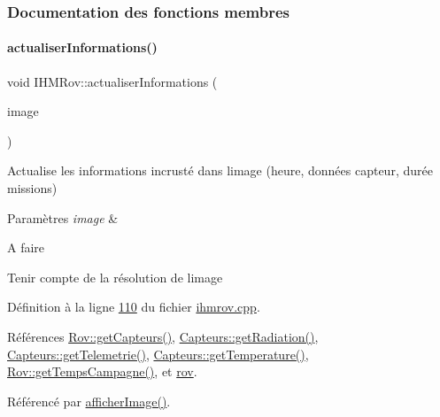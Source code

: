 \subsubsection{Documentation des fonctions membres}
\mbox{\label{class_i_h_m_rov_a58ba3661c111c9ab2d6f1e3c52f4ec21}} 
\paragraph{\texorpdfstring{actualiser\+Informations()}{actualiserInformations()}}
{\footnotesize\ttfamily void I\+H\+M\+Rov\+::actualiser\+Informations (\begin{DoxyParamCaption}\item[{Q\+Pixmap \&}]{image }\end{DoxyParamCaption})\hspace{0.3cm}{\ttfamily [private]}}



Actualise les informations incrusté dans l\textquotesingle{}image (heure, données capteur, durée missions) 


\begin{DoxyParams}{Paramètres}
{\em image} & \\
\hline
\end{DoxyParams}
\begin{DoxyRefDesc}{A faire}
\item[\hyperlink{todo__todo000001}{A faire}]Tenir compte de la résolution de l\textquotesingle{}image \end{DoxyRefDesc}


Définition à la ligne \hyperlink{ihmrov_8cpp_source_l00110}{110} du fichier \hyperlink{ihmrov_8cpp_source}{ihmrov.\+cpp}.



Références \hyperlink{rov_8cpp_source_l00149}{Rov\+::get\+Capteurs()}, \hyperlink{capteurs_8cpp_source_l00054}{Capteurs\+::get\+Radiation()}, \hyperlink{capteurs_8cpp_source_l00039}{Capteurs\+::get\+Telemetrie()}, \hyperlink{capteurs_8cpp_source_l00044}{Capteurs\+::get\+Temperature()}, \hyperlink{rov_8cpp_source_l00154}{Rov\+::get\+Temps\+Campagne()}, et \hyperlink{ihmrov_8h_source_l00047}{rov}.



Référencé par \hyperlink{ihmrov_8cpp_source_l00154}{afficher\+Image()}.


